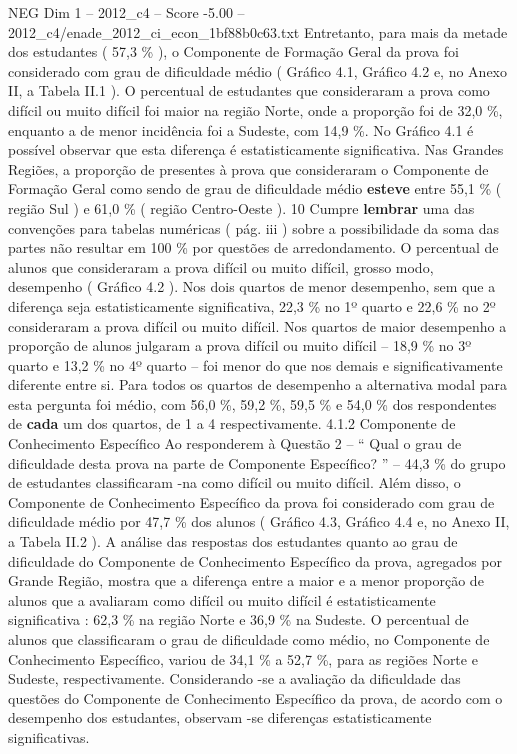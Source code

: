 \begin{textsample}{NEG Dim 1 – 2012\_c4 – Score -5.00 – 2012\_c4/enade\_2012\_ci\_econ\_1bf88b0c63.txt}
Entretanto, para mais da metade dos estudantes ( 57,3 \% ), o Componente de Formação Geral da prova foi considerado com grau de dificuldade médio ( Gráfico 4.1, Gráfico 4.2 e, no Anexo II, a Tabela II.1 ).
O percentual de estudantes que consideraram a prova como difícil ou muito difícil foi maior na região Norte, onde a proporção foi de 32,0 \%, enquanto a de menor incidência foi a Sudeste, com 14,9 \%.
No Gráfico 4.1 é possível observar que esta diferença é estatisticamente significativa.
Nas Grandes Regiões, a proporção de presentes à prova que consideraram o Componente de Formação Geral como sendo de grau de dificuldade médio \textbf{esteve} entre 55,1 \% ( região Sul ) e 61,0 \% ( região Centro-Oeste ). 10 Cumpre \textbf{lembrar} uma das convenções para tabelas numéricas ( pág. iii ) sobre a possibilidade da soma das partes não resultar em 100 \% por questões de arredondamento.
O percentual de alunos que consideraram a prova difícil ou muito difícil, grosso modo, desempenho ( Gráfico 4.2 ).
Nos dois quartos de menor desempenho, sem que a diferença seja estatisticamente significativa, 22,3 \% no 1º quarto e 22,6 \% no 2º consideraram a prova difícil ou muito difícil.
Nos quartos de maior desempenho a proporção de alunos julgaram a prova difícil ou muito difícil – 18,9 \% no 3º quarto e 13,2 \% no 4º quarto – foi menor do que nos demais e significativamente diferente entre si.
Para todos os quartos de desempenho a alternativa modal para esta pergunta foi médio, com 56,0 \%, 59,2 \%, 59,5 \% e 54,0 \% dos respondentes de \textbf{cada} um dos quartos, de 1 a 4 respectivamente. 4.1.2 Componente de Conhecimento Específico Ao responderem à Questão 2 – “ Qual o grau de dificuldade desta prova na parte de Componente Específico? ” – 44,3 \% do grupo de estudantes classificaram -na como difícil ou muito difícil.
Além disso, o Componente de Conhecimento Específico da prova foi considerado com grau de dificuldade médio por 47,7 \% dos alunos ( Gráfico 4.3, Gráfico 4.4 e, no Anexo II, a Tabela II.2 ).
A análise das respostas dos estudantes quanto ao grau de dificuldade do Componente de Conhecimento Específico da prova, agregados por Grande Região, mostra que a diferença entre a maior e a menor proporção de alunos que a avaliaram como difícil ou muito difícil é estatisticamente significativa : 62,3 \% na região Norte e 36,9 \% na Sudeste.
O percentual de alunos que classificaram o grau de dificuldade como médio, no Componente de Conhecimento Específico, variou de 34,1 \% a 52,7 \%, para as regiões Norte e Sudeste, respectivamente.
Considerando -se a avaliação da dificuldade das questões do Componente de Conhecimento Específico da prova, de acordo com o desempenho dos estudantes, observam -se diferenças estatisticamente significativas.

\end{textsample}
